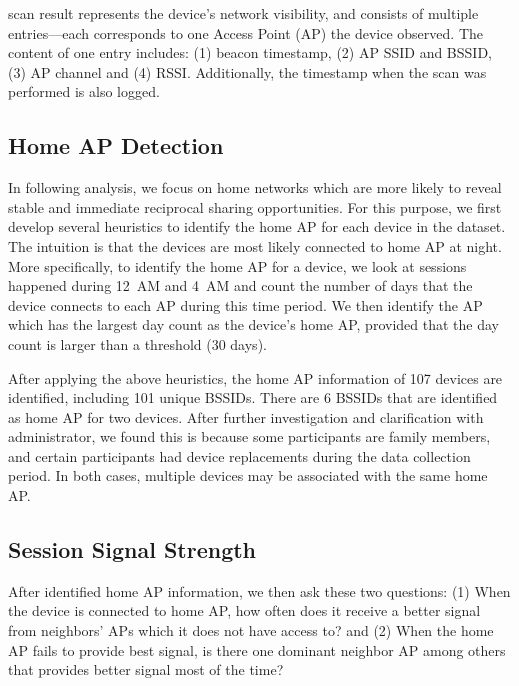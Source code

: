 \wifi{} scan result represents the device's network visibility, and consists of
multiple entries---each corresponds to one \wifi{} Access Point (AP) the device
observed. The content of one entry includes: (1) beacon timestamp, (2) AP SSID
and BSSID, (3) AP channel and (4) RSSI. Additionally, the timestamp when the
scan was performed is also logged.

\subsection{Home AP Detection}
\label{subsec:homeap}

In following analysis, we focus on home \wifi{} networks which are more likely
to reveal stable and immediate reciprocal sharing opportunities. For this
purpose, we first develop several heuristics to identify the home AP for each
device in the dataset. The intuition is that the devices are most likely
connected to home AP at night. More specifically, to identify the home AP for a
device, we look at \wifi{} sessions happened during 12~AM and 4~AM and count the
number of days that the device connects to each AP during this time period. We
then identify the AP which has the largest day count as the device's home AP,
provided that the day count is larger than a threshold (30 days).

After applying the above heuristics, the home AP information of 107 devices are
identified, including 101 unique BSSIDs. There are 6 BSSIDs that are identified
as home AP for two devices. After further investigation and clarification with
\PhoneLab{} administrator, we found this is because some participants are family
members, and certain participants had device replacements during the data
collection period. In both cases, multiple devices may be associated with the
same home AP.

\subsection{\wifi{} Session Signal Strength}
\label{subsec:better}

After identified home AP information, we then ask these two questions: (1) When
the device is connected to home AP, how often does it receive a better signal
from neighbors' APs which it does not have access to? and (2) When the home AP
fails to provide best signal, is there one dominant neighbor AP among others
that provides better signal most of the time?

